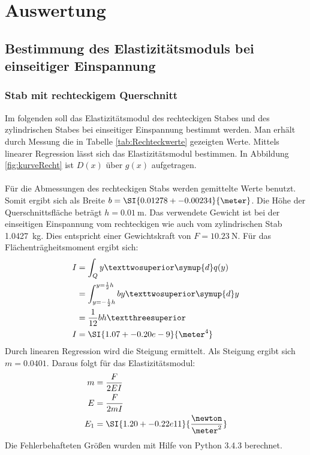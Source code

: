 \section{Auswertung}
\label{sec:Auswertung}
\subsection{Bestimmung des Elastizitätsmoduls bei einseitiger Einspannung}
\subsubsection{Stab mit rechteckigem Querschnitt}
Im folgenden soll das Elastizitätsmodul des rechteckigen Stabes und des zylindrischen Stabes bei einseitiger Einspannung bestimmt werden.
Man erhält durch Messung die in Tabelle \ref{tab:Rechteckwerte} gezeigten Werte. Mittels linearer Regression lässt sich das Elastizitätsmodul bestimmen.
In Abbildung \ref{fig:kurveRecht} ist $D(x)$ über $g(x)$ aufgetragen.
\\
\\
Für die Abmessungen des rechteckigen Stabs werden gemittelte Werte benutzt. Somit ergibt sich als Breite $b=\SI{0.01278+-0.00234}{\meter}$.
Die Höhe der Querschnittsfläche beträgt $h=\SI{0.01}{\meter}$.
Das verwendete Gewicht ist bei der einseitigen Einspannung vom rechteckigen wie auch vom zylindrischen Stab \SI{1.0427}{\kilo\gram}. Dies entspricht einer
Gewichtskraft von $F=\SI{10.23}{\newton}$. Für das Flächenträgheitsmoment ergibt sich:
\begin{align*}
  I &= \int_Q y² \symup{d}q(y) \\
    &= \int_{y=-\frac{1}{2}h}^{y=\frac{1}{2}h} by² \symup{d}y \\
    &= \frac{1}{12}bh³ \\
  I &= \SI{1.07+-0.20e-9}{\meter^4}\\
\end{align*}
Durch linearen Regression wird die Steigung ermittelt. Als Steigung ergibt sich $m=\num{0.0401}$. Daraus folgt für das Elastizitätsmodul:
\begin{align*}
  m   &= \frac{F}{2EI} \\
  E   &= \frac{F}{2mI} \\
  E_1 &= \SI{1.20+-0.22e11}{\frac{\newton}{\meter^2}} \\
\end{align*}
Die Fehlerbehafteten Größen wurden mit Hilfe von Python 3.4.3 berechnet.

